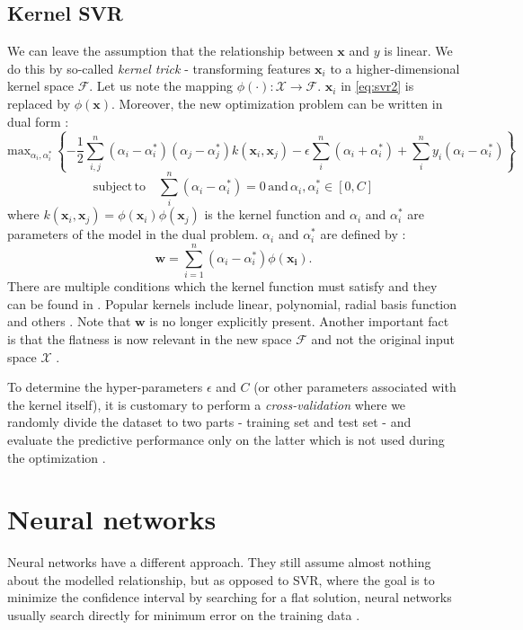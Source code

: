 \subsection*{Kernel SVR}
We can leave the assumption that the relationship between $\bm{x}$ and $y$ is linear. We do this by so-called \textit{kernel trick} - transforming features $\bm{x}_i$ to a higher-dimensional kernel space $\mathcal{F}$. Let us note the mapping $\phi(\cdot): \mathcal{X} \rightarrow \mathcal{F}$. $\bm{x}_i$ in \ref{eq:svr2} is replaced by $\phi(\bm{x})$. Moreover, the new optimization problem can be written in dual form \cite{smola2004}:
\begin{equation}
	\mathrm{max}_{\alpha_i,\alpha_i^*} \, \left\{ -\frac{1}{2}\sum_{i,j}^{n}\left(\alpha_i - \alpha_i^*\right)\left(\alpha_j - \alpha_j^*\right)k(\bm{x}_i,\bm{x}_j) -\epsilon\sum_{i}^{n}\left(\alpha_i + \alpha_i^*\right) + \sum_{i}^{n}y_i\left(\alpha_i - \alpha_i^*\right) \right\}
\end{equation}
\begin{equation}
	\mathrm{subject}\,\mathrm{to}\quad  \sum_{i}^{n}\left(\alpha_i - \alpha_i^*\right) = 0 \,\mathrm{and}\, \alpha_i, \alpha_i^* \in \left[0,C\right]
\end{equation}
where $k(\bm{x}_i,\bm{x}_j) = \phi(\bm{x}_i)\phi(\bm{x}_j)$ is the kernel function and $\alpha_i$ and $\alpha_i^*$ are parameters of the model in the dual problem. $\alpha_i$ and $\alpha_i^*$ are defined by \cite{smola2004}:
\begin{equation}
	\bm{w} = \sum_{i=1}^n(\alpha_i - \alpha_i^*) \phi(\bm{x_i}).
\end{equation}
There are multiple conditions which the kernel function must satisfy and they can be found in \cite{smola2004}. Popular kernels include linear, polynomial, radial basis function and others \cite{zhang2020}.
Note that $\bm{w}$ is no longer explicitly present. Another important fact is that the flatness is now relevant in the new space $\mathcal{F}$ and not the original input space $\mathcal{X}$ \cite{smola2004}.

To determine the hyper-parameters $\epsilon$ and $C$ (or other parameters associated with the kernel itself), it is customary to perform a \textit{cross-validation} where we randomly divide the dataset to two parts - training set and test set - and evaluate the predictive performance only on the latter which is not used during the optimization \cite{zhang2020}.

\section{Neural networks}
Neural networks have a different approach. They still assume almost nothing about the modelled relationship, but as opposed to SVR, where the goal is to minimize the confidence interval by searching for a flat solution, neural networks usually search directly for minimum error on the training data \cite{vapnik2000}. 

